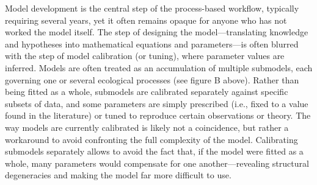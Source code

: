 \documentclass[11pt]{article}
\begin{document}
\begin{tcolorbox}
{\begin{multicols}{2}
\begin{minipage}[t]{\linewidth}
    \vspace*{1mm}
\end{minipage}

\noindent %
Model development is the central step of the process-based workflow, typically requiring several years, yet it often remains opaque for anyone who has not worked the model itself. The step of designing the model---translating knowledge and hypotheses into mathematical equations and parameters---is often blurred with the step of model calibration (or tuning), where parameter values are inferred. Models are often treated as an accumulation of multiple submodels, each governing one or several ecological processes (see figure B above). Rather than being fitted as a whole, submodels are calibrated separately against specific subsets of data, and some parameters are simply prescribed (i.e., fixed to a value found in the literature) or tuned to reproduce certain observations or theory. The way models are currently calibrated is likely not a coincidence, but rather a workaround to avoid confronting the full complexity of the model. Calibrating submodels separately allows to avoid the fact that, if the model were fitted as a whole, many parameters would compensate for one another---revealing structural degeneracies and making the model far more difficult to use.  %

\vfill

\end{multicols}}


\end{tcolorbox}
\end{document}
